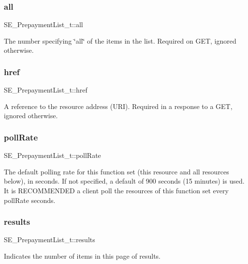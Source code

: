 \subsubsection{\texorpdfstring{all}{all}}
{\footnotesize\ttfamily S\+E\+\_\+\+Prepayment\+List\+\_\+t\+::all}

The number specifying \char`\"{}all\char`\"{} of the items in the list. Required on G\+ET, ignored otherwise. \mbox{\label{group__PrepaymentList_gade40515dbf8f0153a026bc727070c5d6}} 
\subsubsection{\texorpdfstring{href}{href}}
{\footnotesize\ttfamily S\+E\+\_\+\+Prepayment\+List\+\_\+t\+::href}

A reference to the resource address (U\+RI). Required in a response to a G\+ET, ignored otherwise. \mbox{\label{group__PrepaymentList_gac66cf2fbf74ea3446a4efe5d6fdf47c9}} 
\subsubsection{\texorpdfstring{poll\+Rate}{pollRate}}
{\footnotesize\ttfamily S\+E\+\_\+\+Prepayment\+List\+\_\+t\+::poll\+Rate}

The default polling rate for this function set (this resource and all resources below), in seconds. If not specified, a default of 900 seconds (15 minutes) is used. It is R\+E\+C\+O\+M\+M\+E\+N\+D\+ED a client poll the resources of this function set every poll\+Rate seconds. \mbox{\label{group__PrepaymentList_gae1c498eedbfe6cd548de3255354cb516}} 
\subsubsection{\texorpdfstring{results}{results}}
{\footnotesize\ttfamily S\+E\+\_\+\+Prepayment\+List\+\_\+t\+::results}

Indicates the number of items in this page of results. \mbox{\label{group__PrepaymentList_ga164852891c027b156fae9dcb1228637d}} 
